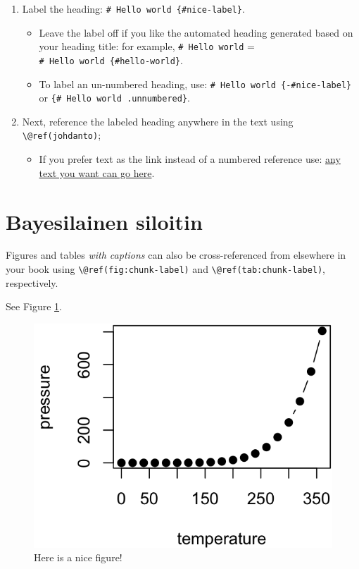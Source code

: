 \documentclass[
  12pt,
  a4paper, twoside]{book}
\providecommand{\tightlist}{%
  \setlength{\itemsep}{0pt}\setlength{\parskip}{0pt}}
\theoremstyle{definition}
\theoremstyle{definition}
\theoremstyle{definition}
\theoremstyle{definition}
\theoremstyle{remark}
\begin{document}
\begin{enumerate}
\def\labelenumi{\arabic{enumi}.}
\tightlist
\item
  Label the heading: \texttt{\#\ Hello\ world\ \{\#nice-label\}}.

  \begin{itemize}
  \tightlist
  \item
    Leave the label off if you like the automated heading generated based on your heading title: for example, \texttt{\#\ Hello\ world} = \texttt{\#\ Hello\ world\ \{\#hello-world\}}.
  \item
    To label an un-numbered heading, use: \texttt{\#\ Hello\ world\ \{-\#nice-label\}} or \texttt{\{\#\ Hello\ world\ .unnumbered\}}.
  \end{itemize}
\item
  Next, reference the labeled heading anywhere in the text using \texttt{\textbackslash{}@ref(johdanto)};

  \begin{itemize}
  \tightlist
  \item
    If you prefer text as the link instead of a numbered reference use: \protect\hyperlink{johdanto}{any text you want can go here}.
  \end{itemize}
\end{enumerate}

\hypertarget{bayesilainen-siloitin}{%
\section{Bayesilainen siloitin}\label{bayesilainen-siloitin}}

Figures and tables \emph{with captions} can also be cross-referenced from elsewhere in your book using \texttt{\textbackslash{}@ref(fig:chunk-label)} and \texttt{\textbackslash{}@ref(tab:chunk-label)}, respectively.

See Figure \ref{fig:nice-fig}.

\begin{figure}

{\centering \includegraphics[width=0.8\linewidth]{output/figures/nice-fig-1} 

}

\caption{Here is a nice figure!}\label{fig:nice-fig}
\end{figure}
\end{document}
